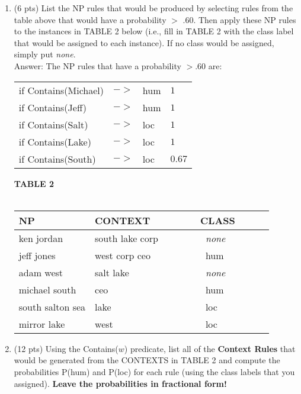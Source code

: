 \documentclass[11pt]{article}
\begin{document}
\begin{enumerate}
\begin{enumerate}
\newpage
\item (6 pts) List the NP rules that would be produced by selecting
  rules from the table above that would have a probability $>$ .60. Then apply these NP rules to the
  instances in TABLE 2 below (i.e., fill in  TABLE 2 with the class
  label that would be assigned to each instance). If no class
  would be assigned, simply put {\it none}. \\
Answer: The NP rules that have a probability $> .60$ are:\\
\begin{center}
 \begin{tabular}{|llll|}\hline
 if Contains(Michael) & $->$ & {\sc hum} & $1$\\  
 if Contains(Jeff) & $->$ & {\sc hum} & $1$\\ 
 if Contains(Salt) & $->$ & {\sc loc} & $1$\\ 
 if Contains(Lake) & $->$ & {\sc loc} & $1$\\
 if Contains(South) & $->$ & {\sc loc} & $0.67$ \\  \hline 
 \end{tabular}
 \end{center}
 \begin{center}
 \textbf{TABLE 2} \\  ~ \\
 \begin{tabular}{|lll|} \hline
 \textbf{NP}  & \textbf{CONTEXT} & \textbf{~~~~~~CLASS~~~~~} \\ \hline
 ken jordan & south lake corp & {~~~~~~~~\it none~~~~~~~~} \\  
 jeff jones &  west corp ceo & {~~~~~~~~\sc hum~~~~~~~~} \\ 
 adam west & salt lake  & {~~~~~~~~\it none~~~~~~~~} \\ 
 michael south  & ceo  & {~~~~~~~~\sc hum~~~~~~~~} \\ 
 south salton sea   & lake & {~~~~~~~~\sc loc~~~~~~~~} \\ 
 mirror lake & west   & {~~~~~~~~\sc loc~~~~~~~~} \\ \hline 
 \end{tabular}
 \end{center}
 \vspace*{.2in}

\item (12 pts) Using the Contains($w$) predicate, list all of the 
\textbf{Context Rules} that would be generated from the CONTEXTS in TABLE
  2 and compute the probabilities P({\sc hum}) and P({\sc loc}) for
  each rule (using the class labels that you assigned). 
\textbf{Leave the     probabilities in fractional form!}  \\


\end{enumerate}
\end{enumerate}
\end{document}

